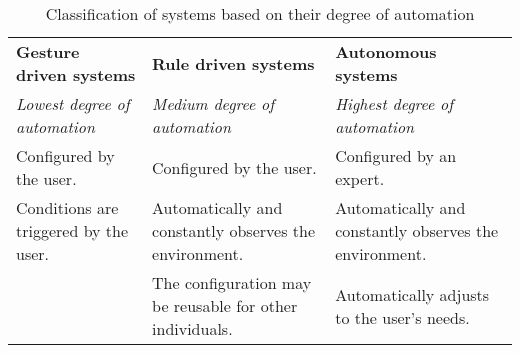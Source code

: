 \begin{table}[h]
    \centering
    \begin{tabularx}{\textwidth}{XXX}
    \textbf{Gesture driven systems}       & \textbf{Rule driven systems}                             & \textbf{Autonomous systems} \\
    \textit{Lowest degree of automation}  & \textit{Medium degree of automation}                     & \textit{Highest degree of automation}\\
    Configured by the user.               & Configured by the user.                                  & Configured by an expert.\\
    Conditions are triggered by the user. & Automatically and constantly observes the environment.   & Automatically and constantly observes the environment.\\
    ~                                     & The configuration may be reusable for other individuals. & Automatically adjusts to the user's needs.\\
    \end{tabularx}
    \caption{Classification of systems based on their degree of automation}
    \label{tbl:system-categories}
\end{table}

